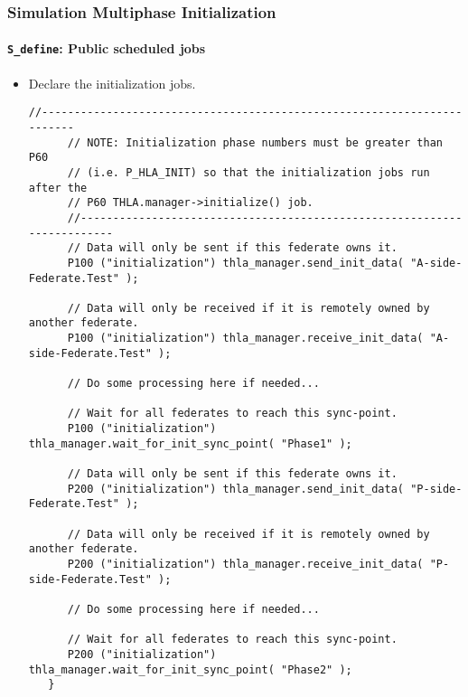    \begin{frame}[fragile]
      \frametitle{Simulation Multiphase Initialization}
      \framesubtitle{\texttt{S\_define}: Public scheduled jobs}
      \begin{itemize}
         \item Declare the initialization jobs.
\begin{Verbatim}[frame=single, fontsize=\tiny]
      //------------------------------------------------------------------------
      // NOTE: Initialization phase numbers must be greater than P60 
      // (i.e. P_HLA_INIT) so that the initialization jobs run after the
      // P60 THLA.manager->initialize() job.
      //------------------------------------------------------------------------
      // Data will only be sent if this federate owns it.
      P100 ("initialization") thla_manager.send_init_data( "A-side-Federate.Test" );
      
      // Data will only be received if it is remotely owned by another federate.
      P100 ("initialization") thla_manager.receive_init_data( "A-side-Federate.Test" );
      
      // Do some processing here if needed...
      
      // Wait for all federates to reach this sync-point.
      P100 ("initialization") thla_manager.wait_for_init_sync_point( "Phase1" );
      
      // Data will only be sent if this federate owns it.
      P200 ("initialization") thla_manager.send_init_data( "P-side-Federate.Test" );
      
      // Data will only be received if it is remotely owned by another federate.
      P200 ("initialization") thla_manager.receive_init_data( "P-side-Federate.Test" );
      
      // Do some processing here if needed...
      
      // Wait for all federates to reach this sync-point.
      P200 ("initialization") thla_manager.wait_for_init_sync_point( "Phase2" );
   }
\end{Verbatim}
         \end{itemize}
   \end{frame}
   
